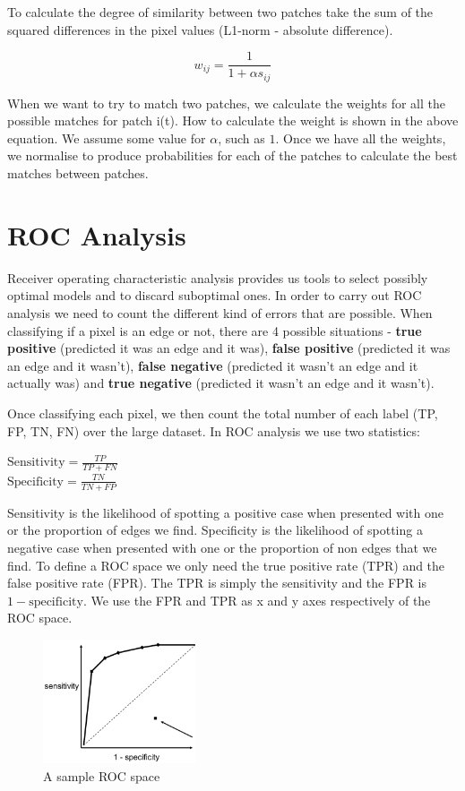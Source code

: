 \documentclass{article}
\begin{document}
	To calculate the degree of similarity between two patches take the sum of the squared differences in the pixel values (L1-norm - absolute difference).
	
	\[ w_{ij} = \frac{1}{1 + \alpha s_{ij}} \]
	
	When we want to try to match two patches, we calculate the weights for all the possible matches for patch i(t). How to calculate the weight is shown in the above equation. We assume some value for $\alpha$, such as $1$. Once we have all the weights, we normalise to produce probabilities for each of the patches to calculate the best matches between patches.
	

	\section{ROC Analysis}
	Receiver operating characteristic analysis provides us tools to select possibly optimal models and to discard suboptimal ones. In order to carry out ROC analysis we need to count the different kind of errors that are possible. When classifying if a pixel is an edge or not, there are 4 possible situations - \textbf{true positive} (predicted it was an edge and it was), \textbf{false positive} (predicted it was an edge and it wasn't), \textbf{false negative} (predicted it wasn't an edge and it actually was) and \textbf{true negative} (predicted it wasn't an edge and it wasn't).
	
Once classifying each pixel, we then count the total number of each label (TP, FP, TN, FN) over the large dataset. In ROC analysis we use two statistics:
	\begin{multicols}{2}
		\noindent
		\centering
			$ \text{Sensitivity} = \frac{TP}{TP+FN}$ \\
			$ \text{Specificity} = \frac{TN}{TN+FP}$
	\end{multicols}	
	Sensitivity is the likelihood of spotting a positive case when presented with one or the proportion of edges we find. Specificity is the likelihood of spotting a negative case when presented with one or the proportion of non edges that we find. To define a ROC space we only need the true positive rate (TPR) and the false positive rate (FPR). The TPR is simply the sensitivity and the FPR is $1 - \text{specificity}$. We use the FPR and TPR as x and y axes respectively of the ROC space.
	
	\begin{figure}
		\centering
		\includegraphics[width=0.4\textwidth]{roc_analysis}
		\caption{A sample ROC space}
		\label{fig:roc_analysis}
	\end{figure}
	
\end{document}
